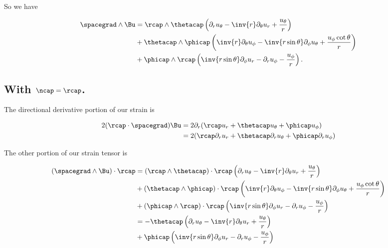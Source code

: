 So we have

\begin{equation}\label{eqn:stressTensorVectorForm:230}
\begin{aligned}
\spacegrad \wedge \Bu
&=
\rcap \wedge \thetacap
\left( \partial_r u_\theta - \inv{r} \partial_\theta u_r + \frac{u_\theta}{r}
\right) 
\\
& +
\thetacap \wedge \phicap
\left(
\inv{r} \partial_\theta u_\phi - \inv{r \sin\theta} \partial_\phi u_\theta
+ \frac{u_\phi \cot\theta}{r}
\right)
\\
& +
\phicap \wedge \rcap
\left(
\inv{r \sin\theta} \partial_\phi u_r - \partial_r u_\phi
- \frac{u_\phi}{r}
\right).
\end{aligned}
\end{equation}

\subsection{With $\ncap = \rcap$.}

The directional derivative portion of our strain is

\begin{align*}
2 (\rcap \cdot \spacegrad) \Bu
&=
2 \partial_r (
\rcap u_r + \thetacap u_\theta + \phicap u_\phi ) \\
&=
2 (
\rcap \partial_r u_r + \thetacap \partial_r u_\theta + \phicap \partial_r u_\phi )
\end{align*}

The other portion of our strain tensor is

\begin{align*}
(\spacegrad \wedge \Bu) \cdot \rcap
&=
(\rcap \wedge \thetacap) \cdot \rcap
\left( \partial_r u_\theta - \inv{r} \partial_\theta u_r + \frac{u_\theta}{r}
\right) 
\\
& +
(\thetacap \wedge \phicap) \cdot \rcap
\left(
\inv{r} \partial_\theta u_\phi - \inv{r \sin\theta} \partial_\phi u_\theta
+ \frac{u_\phi \cot\theta}{r}
\right)
\\
& +
(\phicap \wedge \rcap) \cdot \rcap
\left(
\inv{r \sin\theta} \partial_\phi u_r - \partial_r u_\phi
- \frac{u_\phi}{r}
\right) \\
&=
-\thetacap
\left( \partial_r u_\theta - \inv{r} \partial_\theta u_r + \frac{u_\theta}{r}
\right) 
\\
& +
\phicap 
\left(
\inv{r \sin\theta} \partial_\phi u_r - \partial_r u_\phi
- \frac{u_\phi}{r}
\right) 
\end{align*}

